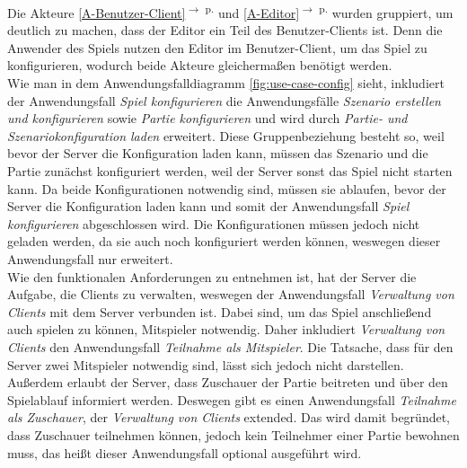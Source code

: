 \documentclass[12pt]{article}
\newcounter{fa}
\newcommand{\rref}[1]{\ref{#1}\textsuperscript{$\rightarrow$ p. \pageref{#1}}}
\begin{document}
Die Akteure \rref{A-Benutzer-Client} und \rref{A-Editor} wurden gruppiert, um deutlich zu machen, dass der Editor ein Teil des Benutzer-Clients ist. Denn die Anwender des Spiels nutzen den Editor im Benutzer-Client, um das Spiel zu konfigurieren, wodurch beide Akteure gleichermaßen benötigt werden. \\ Wie man in dem Anwendungsfalldiagramm \autoref{fig:use-case-config} sieht, inkludiert der Anwendungsfall \textit{Spiel konfigurieren} die Anwendungsfälle \textit{Szenario erstellen und konfigurieren} sowie \textit{Partie konfigurieren} und wird durch \textit{Partie- und Szenariokonfiguration laden} erweitert. Diese Gruppenbeziehung besteht so, weil bevor der Server die Konfiguration laden kann, müssen das Szenario und die Partie zunächst konfiguriert werden, weil der Server sonst das Spiel nicht starten kann. Da beide Konfigurationen notwendig sind, müssen sie ablaufen, bevor der Server die Konfiguration laden kann und somit der Anwendungsfall \textit{Spiel konfigurieren} abgeschlossen wird. Die Konfigurationen müssen jedoch nicht geladen werden, da sie auch noch konfiguriert werden können, weswegen dieser Anwendungsfall nur erweitert.\\ Wie den funktionalen Anforderungen zu entnehmen ist, hat der Server die Aufgabe, die Clients zu verwalten, weswegen der Anwendungsfall \textit{Verwaltung von Clients} mit dem Server verbunden ist. Dabei sind, um das Spiel anschließend auch spielen zu können, Mitspieler notwendig. Daher inkludiert \textit{Verwaltung von Clients} den Anwendungsfall \textit{Teilnahme als Mitspieler}. Die Tatsache, dass für den Server zwei Mitspieler notwendig sind, lässt sich jedoch nicht darstellen. Außerdem erlaubt der Server, dass Zuschauer der Partie beitreten und über den Spielablauf informiert werden. Deswegen gibt es einen Anwendungsfall \textit{Teilnahme als Zuschauer}, der \textit{Verwaltung von Clients} extended. Das wird damit begründet, dass Zuschauer teilnehmen können, jedoch kein Teilnehmer einer Partie bewohnen muss, das heißt dieser Anwendungsfall optional ausgeführt wird. 
\end{document}
